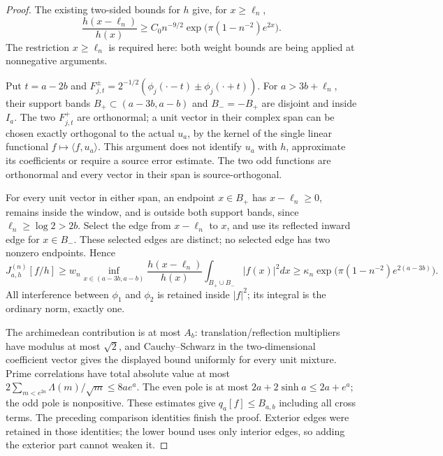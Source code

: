 \begin{proof}
The existing two-sided bounds for $h$ give, for $x\ge\ell_n$,
\[
 \frac{h(x-\ell_n)}{h(x)}
 \ge C_0 n^{-9/2}
             \exp\!\bigl(\pi(1-n^{-2})e^{2x}\bigr).
\]
The restriction $x\ge\ell_n$ is required here: both weight bounds
are being applied at nonnegative arguments.

Put $t=a-2b$ and
$F_{j,t}^{\pm}=2^{-1/2}(\phi_j(\cdot-t)\pm\phi_j(\cdot+t))$.
For $a>3b+\ell_n$, their support bands
$B_+\subset(a-3b,a-b)$ and $B_-=-B_+$ are disjoint and inside $I_a$.
The two $F_{j,t}^+$ are orthonormal; a unit vector in their complex
span can be chosen exactly orthogonal to the actual $u_a$, by the
kernel of the single linear functional $f\mapsto\langle f,u_a\rangle$.
This argument does not identify $u_a$ with $h$, approximate its
coefficients or require a source error estimate. The two odd functions
are orthonormal and every vector in their span is source-orthogonal.

For every unit vector in either span, an endpoint $x\in B_+$ has
$x-\ell_n\ge0$, remains inside the window, and is outside both support
bands, since $\ell_n\ge\log2>2b$. Select the edge from $x-\ell_n$ to
$x$, and use its reflected inward edge for $x\in B_-$. These selected
edges are distinct; no selected edge has two nonzero endpoints. Hence
\[
 J^{(n)}_{a,h}[f/h]
 \ge w_n\inf_{x\in(a-3b,a-b)}\frac{h(x-\ell_n)}{h(x)}
             \int_{B_+\cup B_-}|f(x)|^2dx
 \ge\kappa_n\exp\!\bigl(\pi(1-n^{-2})e^{2(a-3b)}\bigr).
\]
All interference between $\phi_1$ and $\phi_2$ is retained inside
$|f|^2$; its integral is the ordinary norm, exactly one.

The archimedean contribution is at most $A_b$: translation/reflection
multipliers have modulus at most $\sqrt2$, and Cauchy--Schwarz in the
two-dimensional coefficient vector gives the displayed bound uniformly
for every unit mixture. Prime correlations have total absolute value
at most $2\sum_{m<e^{2a}}\Lambda(m)/\sqrt m\le8ae^a$.
The even pole is at most $2a+2\sinh a\le2a+e^a$; the odd pole is
nonpositive. These estimates give $q_a[f]\le B_{a,b}$ including all
cross terms. The preceding comparison identities finish the proof.
Exterior edges were retained in those identities; the lower bound uses
only interior edges, so adding the exterior part cannot weaken it.
\end{proof}

